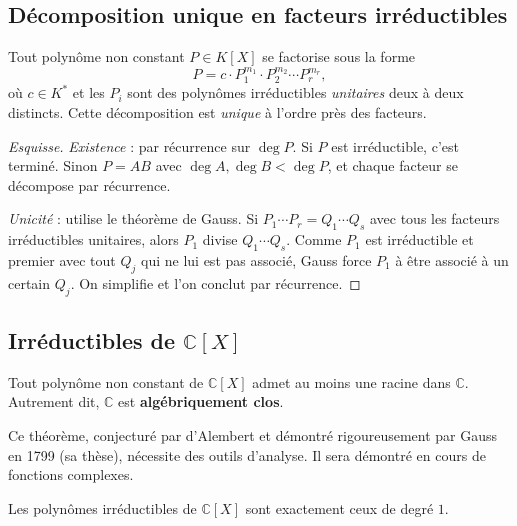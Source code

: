 \subsection{Décomposition unique en facteurs irréductibles}

\begin{theoreme}
Tout polynôme non constant $P \in K[X]$ se factorise sous la forme
\[ P = c \cdot P_1^{m_1} \cdot P_2^{m_2} \cdots P_r^{m_r}, \]
où $c \in K^*$ et les $P_i$ sont des polynômes irréductibles \emph{unitaires} deux à deux distincts. Cette décomposition est \emph{unique} à l'ordre près des facteurs.
\end{theoreme}

\begin{proof}[Esquisse]
\emph{Existence} : par récurrence sur $\deg P$. Si $P$ est irréductible, c'est terminé. Sinon $P = AB$ avec $\deg A, \deg B < \deg P$, et chaque facteur se décompose par récurrence.

\emph{Unicité} : utilise le théorème de Gauss. Si $P_1 \cdots P_r = Q_1 \cdots Q_s$ avec tous les facteurs irréductibles unitaires, alors $P_1$ divise $Q_1 \cdots Q_s$. Comme $P_1$ est irréductible et premier avec tout $Q_j$ qui ne lui est pas associé, Gauss force $P_1$ à être associé à un certain $Q_j$. On simplifie et l'on conclut par récurrence.
\end{proof}

\subsection{Irréductibles de $\mathbb{C}[X]$}

\begin{theoreme}
Tout polynôme non constant de $\mathbb{C}[X]$ admet au moins une racine dans $\mathbb{C}$. Autrement dit, $\mathbb{C}$ est \textbf{algébriquement clos}.
\end{theoreme}

\begin{remarque}
Ce théorème, conjecturé par d'Alembert et démontré rigoureusement par Gauss en 1799 (sa thèse), nécessite des outils d'analyse. Il sera démontré en cours de fonctions complexes.
\end{remarque}

\begin{corollaire}
Les polynômes irréductibles de $\mathbb{C}[X]$ sont exactement ceux de degré $1$.
\end{corollaire}

